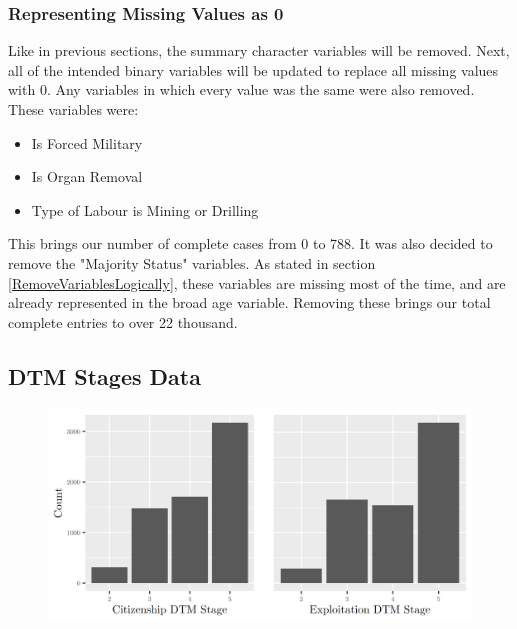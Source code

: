 \documentclass{article} %
\begin{document}
\subsubsection{Representing Missing Values as 0}

Like in previous sections, the summary character variables will be removed. Next, all of the intended binary variables will be updated to replace all missing values with 0. Any variables in which every value was the same were also removed. These variables were:

\begin{multicols}{3}
	\begin{itemize}
		\item Is Forced Military
		\item Is Organ Removal
		\item Type of Labour is Mining or Drilling
	\end{itemize}
\end{multicols}

This brings our number of complete cases from 0 to 788. It was also decided to remove the "Majority Status" variables. As stated in section \ref{RemoveVariablesLogically}, these variables are missing most of the time, and are already represented in the broad age variable. Removing these brings our total complete entries to over 22 thousand. 



\subsection{DTM Stages Data}

\FloatBarrier
\begin{figure}[H]
	\includegraphics[width=\textwidth]{DTMStagesBarplot}
\end{figure}
\FloatBarrier
\end{document}
